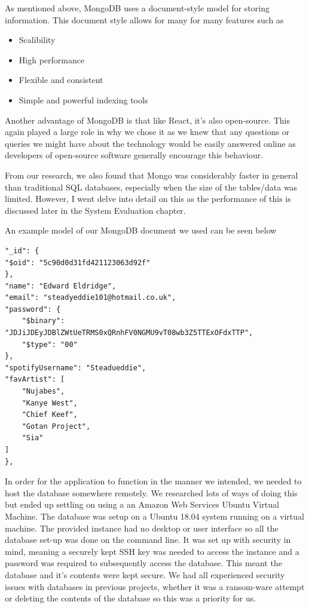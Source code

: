 As mentioned above, MongoDB uses a document-style model for storing information. This document style allows for many for many features such as 

\begin{itemize}
  \item Scalibility
  \item High performance
  \item Flexible and consistent
  \item Simple and powerful indexing tools
\end{itemize}

Another advantage of MongoDB is that like React, it's also open-source. This again played a large role in why we chose it as we knew that any questions or queries we might have about the technology would be easily answered online as developers of open-source software generally encourage this behaviour.

From our research, we also found that Mongo was considerably faster in general than traditional SQL databases, especially when the size of the tables/data was limited. However, I went delve into detail on this as the performance of this is discussed later in the System Evaluation chapter.

An example model of our MongoDB document we used can be seen below

\begin{verbatim}
"_id": {
"$oid": "5c90d0d31fd421123063d92f"
},
"name": "Edward Eldridge",
"email": "steadyeddie101@hotmail.co.uk",
"password": {
    "$binary": "JDJiJDEyJDBlZWtUeTRMS0xQRnhFV0NGMU9vT08wb3Z5TTExOFdxTTP",
    "$type": "00"
},
"spotifyUsername": "Steadueddie",
"favArtist": [
    "Nujabes",
    "Kanye West",
    "Chief Keef",
    "Gotan Project",
    "Sia"
]
},
\end{verbatim}

In order for the application to function in the manner we intended, we needed to host the database somewhere remotely. We researched lots of ways of doing this but ended up settling on using a an Amazon Web Services Ubuntu Virtual Machine. The database was setup on a Ubuntu 18.04 system running on a virtual machine. The provided instance had no desktop or user interface so all the database set-up was done on the command line.
It was set up with security in mind, meaning a securely kept SSH key was needed to access the instance and a password was required to subsequently access the database. This meant the database and it's contents were kept secure. We had all experienced security issues with databases in previous projects, whether it was a ransom-ware attempt or deleting the contents of the database so this was a priority for us.


